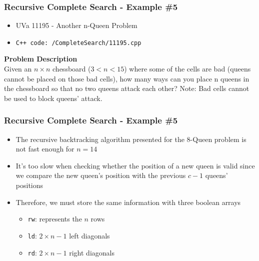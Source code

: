 \documentclass{beamer}
\begin{document}
\begin{frame}[fragile]
\frametitle{Recursive Complete Search - Example \#5}

\begin{itemize}
	\item UVa 11195 - Another n-Queen Problem
    \item \color{red}\verb|C++ code: /CompleteSearch/11195.cpp|\color{black}
\end{itemize}

\color{red}\textbf{Problem Description}\color{black} \\
Given an $n \times n$ chessboard ($3 < n < 15$) where some of the cells are bad (queens cannot be placed on those bad cells), how many ways can you place n queens in the chessboard so that no two queens attack each other? Note: Bad cells cannot be used to block queens’ attack.

\end{frame}

\begin{frame}[fragile]
\frametitle{Recursive Complete Search - Example \#5}

\begin{itemize}
    \item The recursive backtracking algorithm presented for the 8-Queen problem is not fast enough for $n=14$
    \item It's too slow when checking whether the position of a new queen is valid since we compare the new queen's position with the previous $c-1$ queens' positions
    \item Therefore, we must store the same information with three boolean arrays
    	\begin{itemize}
		    \item \verb|rw|: represents the $n$ rows
		    \item \verb|ld|: $2\times n-1$ left diagonals
		    \item \verb|rd|: $2\times n-1$ right diagonals
		\end{itemize}
\end{itemize}

\end{frame}
\end{document}
